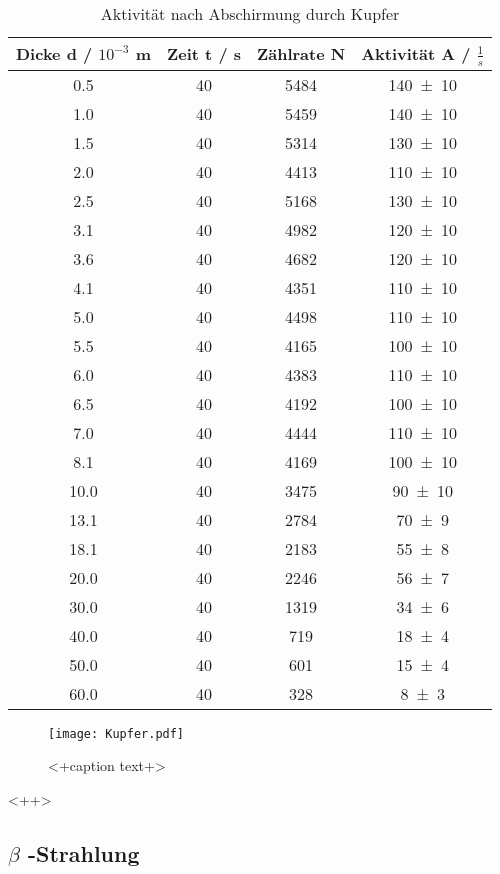 \begin{table}
  \centering
  \begin{tabular}{c c c c}
    \toprule
    Dicke d / $10^{-3}$ m & Zeit t / s & Zählrate N & Aktivität A / $\frac{1}{s}$ \\
    \midrule
    0.5		&40	&5484&	\num{140 +- 10} \\	
    1.0		&40	&5459&	\num{140 +- 10} \\	
    1.5		&40	&5314&	\num{130 +- 10} \\	
    2.0		&40	&4413&	\num{110 +- 10} \\	
    2.5		&40	&5168&	\num{130 +- 10} \\	
    3.1		&40	&4982&	\num{120 +- 10} \\	
    3.6		&40	&4682&	\num{120 +- 10} \\	
    4.1		&40	&4351&	\num{110 +- 10} \\	
    5.0		&40	&4498&	\num{110 +- 10} \\	
    5.5		&40	&4165&	\num{100 +- 10} \\	
    6.0		&40	&4383&	\num{110 +- 10} \\	
    6.5		&40	&4192&	\num{100 +- 10} \\	
    7.0		&40	&4444&	\num{110 +- 10} \\	
    8.1		&40	&4169&	\num{100 +- 10} \\	
    10.0	&40	&3475&	\num{90 +- 10} \\	
    13.1	&40 	&2784&	\num{70 +- 9} \\   	  
    18.1	&40	&2183&	\num{55 +- 8} \\	
    20.0	&40	&2246&	\num{56 +- 7} \\	
    30.0	&40 	&1319&	\num{34 +- 6} \\	     
    40.0    	&40 	&719&	\num{18 +- 4} \\	 
    50.0    	&40 	&601&	\num{15 +- 4} \\	 
    60.0	&40 	&328&	\num{8 +- 3} \\	 
    \bottomrule
  \end{tabular}
  \caption{Aktivität nach Abschirmung durch Kupfer}
  \label{tab:AKupfer}
\end{table}

\begin{figure}
  \centering
  \texttt{[image: Kupfer.pdf]}
  \caption{<+caption text+>}
  \label{fig:<+label+>}
\end{figure}<++>
\subsection{\texorpdfstring{$\beta$ -Strahlung }%
                               {beta -Strahlung}}

